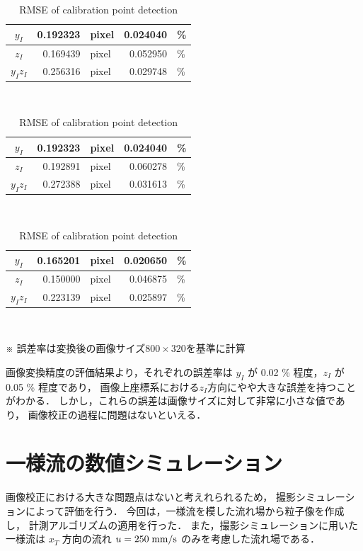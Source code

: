 \documentclass[twocolumn,a4j]{jsarticle}
\begin{document}
\begin{table}[hbtp]
  \centering
  \caption{RMSE of calibration point detection}
  {
    \begin{tabular}{c r l r l}
      \hline
      $y_I$    & 0.192323 & pixel & 0.024040 & \% \\ \hline
      $z_I$    & 0.169439 & pixel & 0.052950 & \% \\ \hline
      $y_Iz_I$ & 0.256316 & pixel & 0.029748 & \% \\ \hline
    \end{tabular}\\
     \baselineskip
    \begin{tabular}{c r l r l}
      \hline
      $y_I$    & 0.192323 & pixel & 0.024040 & \% \\ \hline
      $z_I$    & 0.192891 & pixel & 0.060278 & \% \\ \hline
      $y_Iz_I$ & 0.272388 & pixel & 0.031613 & \% \\ \hline
    \end{tabular}\\
     \baselineskip
    \begin{tabular}{c r l r l}
      \hline
      $y_I$    & 0.165201 & pixel & 0.020650 & \% \\ \hline
      $z_I$    & 0.150000 & pixel & 0.046875 & \% \\ \hline
      $y_Iz_I$ & 0.223139 & pixel & 0.025897 & \% \\ \hline
    \end{tabular}\\
  }
   \baselineskip
  ※ 誤差率は変換後の画像サイズ$800\times320$を基準に計算
\end{table}
\newpage
画像変換精度の評価結果より，それぞれの誤差率は
$y_I$ が 0.02 \% 程度，$z_I$ が 0.05 \% 程度であり，
画像上座標系における$z_I$方向にやや大きな誤差を持つことがわかる．
しかし，これらの誤差は画像サイズに対して非常に小さな値であり，
画像校正の過程に問題はないといえる．

\section{一様流の数値シミュレーション}
画像校正における大きな問題点はないと考えれられるため，
撮影シミュレーションによって評価を行う．
今回は，一様流を模した流れ場から粒子像を作成し，
計測アルゴリズムの適用を行った．
また，撮影シミュレーションに用いた一様流は
$x_T$ 方向の流れ $u = 250\;\rm{mm/s}$ のみを考慮した流れ場である．
 \baselineskip
\end{document}
